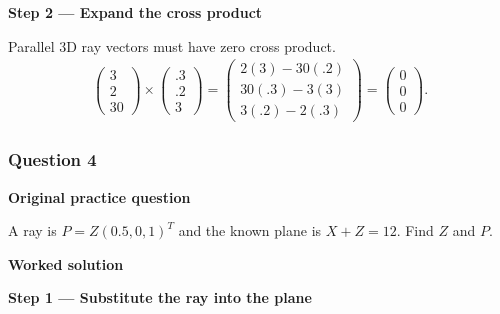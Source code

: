 \documentclass[letterpaper,11pt,english,openany,oneside]{jupyterBook}
\begin{document}
\par\medskip{}
{\color{QuizStepRed}\bfseries Step 2 — Expand the cross product}\par\smallskip

\sphinxAtStartPar
{} Parallel 3D ray vectors must have zero cross product.
{\color{QuizMathBlue} \begin{equation*}
\begin{split}
\begin{pmatrix}3\\2\\30\end{pmatrix}\times\begin{pmatrix}.3\\.2\\3\end{pmatrix}=\begin{pmatrix}2(3)-30(.2)\\30(.3)-3(3)\\3(.2)-2(.3)\end{pmatrix}=\begin{pmatrix}0\\0\\0\end{pmatrix}.
\end{split}
\end{equation*}}
\par

\par\medskip


\subsubsection{Question 4}
\label{\detokenize{lectures/lecture03/tldr:question-4}}\label{\detokenize{lectures/lecture03/tldr:lec03-tldr-q4}}
\par\medskip\textbf{Original practice question}\par\smallskip

\sphinxAtStartPar
A ray is \(P=Z(0.5,0,1)^T\) and the known plane is \(X+Z=12\). Find \(Z\) and \(P\).

\par\medskip

\par\medskip
\textbf{Worked solution}\par\smallskip

\par\medskip{}
{\color{QuizStepRed}\bfseries Step 1 — Substitute the ray into the plane}\par\smallskip
\end{document}
